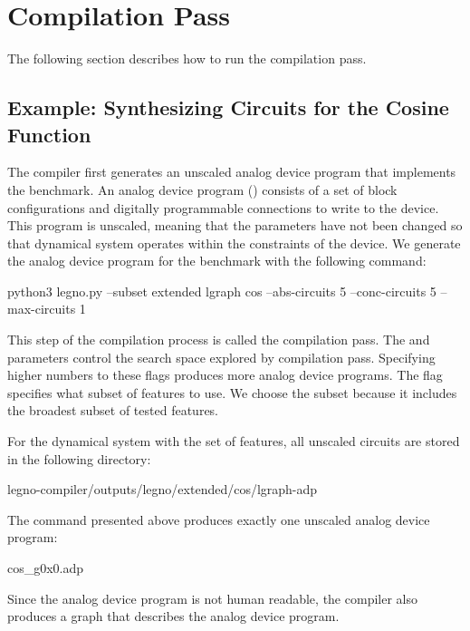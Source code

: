 \chapter{ Compilation Pass}
\label{sec:lgraph}
The following section describes how to run the \lgraph compilation pass.

\section{Example: Synthesizing Circuits for the Cosine Function}

The \legno compiler first generates an unscaled analog device program that
implements the  benchmark. An analog device program ()
consists of a set of block configurations and digitally programmable connections
to write to the device. This program is unscaled, meaning that the parameters
have not been changed so that dynamical system operates within the constraints
of the device. We generate the analog device program for the  benchmark
with the following command:

\begin{snippet}
  python3 legno.py --subset extended lgraph cos --abs-circuits 5 
      --conc-circuits 5 --max-circuits 1
\end{snippet}

This step of the compilation process is called the \lgraph compilation pass. The
 and  parameters control the search
space explored by \lgraph compilation pass. Specifying higher numbers to these
flags produces more analog device programs. The  flag specifies
what subset of features to use. We choose the  subset because it
includes the broadest subset of tested features.

For the  dynamical system with the  set of features, all
unscaled circuits are stored in the following directory:

\begin{snippet}
  legno-compiler/outputs/legno/extended/cos/lgraph-adp
\end{snippet}

The \lgraph command presented above produces exactly one unscaled analog device program: 

\begin{snippet}
  cos_g0x0.adp
\end{snippet}

Since the analog device program is not human readable, the compiler also
produces a graph that describes the analog device program.

